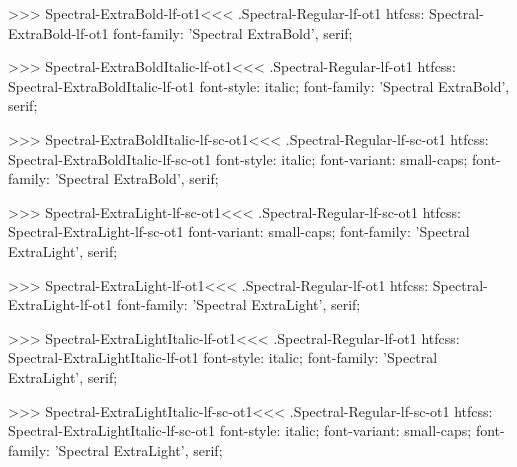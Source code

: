 >>>
\<Spectral-ExtraBold-lf-ot1\><<<
.Spectral-Regular-lf-ot1
htfcss:  Spectral-ExtraBold-lf-ot1  font-family: 'Spectral ExtraBold', serif;

>>>
\<Spectral-ExtraBoldItalic-lf-ot1\><<<
.Spectral-Regular-lf-ot1
htfcss:  Spectral-ExtraBoldItalic-lf-ot1  font-style: italic; font-family: 'Spectral ExtraBold', serif;

>>>
\<Spectral-ExtraBoldItalic-lf-sc-ot1\><<<
.Spectral-Regular-lf-sc-ot1
htfcss:  Spectral-ExtraBoldItalic-lf-sc-ot1  font-style: italic; font-variant: small-caps; font-family: 'Spectral ExtraBold', serif;

>>>
\<Spectral-ExtraLight-lf-sc-ot1\><<<
.Spectral-Regular-lf-sc-ot1
htfcss:  Spectral-ExtraLight-lf-sc-ot1  font-variant: small-caps; font-family: 'Spectral ExtraLight', serif;

>>>
\<Spectral-ExtraLight-lf-ot1\><<<
.Spectral-Regular-lf-ot1
htfcss:  Spectral-ExtraLight-lf-ot1  font-family: 'Spectral ExtraLight', serif;

>>>
\<Spectral-ExtraLightItalic-lf-ot1\><<<
.Spectral-Regular-lf-ot1
htfcss:  Spectral-ExtraLightItalic-lf-ot1  font-style: italic; font-family: 'Spectral ExtraLight', serif;

>>>
\<Spectral-ExtraLightItalic-lf-sc-ot1\><<<
.Spectral-Regular-lf-sc-ot1
htfcss:  Spectral-ExtraLightItalic-lf-sc-ot1  font-style: italic; font-variant: small-caps; font-family: 'Spectral ExtraLight', serif;

